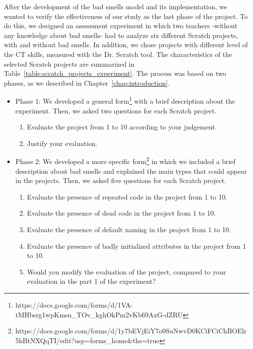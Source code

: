After the development of the bad smells model and its implementation, we wanted to verify the effectiveness of our study as the last phase of the project. To do this, we designed an assessment experiment in which two teachers -without any knowledge about bad smells- had to analyze six different Scratch projects, with and without bad smells. In addition, we chose projects with different level of the CT skills, measured with the Dr. Scratch tool. The characteristics of the selected Scratch projects are summarized in Table~\ref{table:scratch_projects_experiment}. The process was based on two phases, as we described in Chapter~\ref{chap:introduction}.

\begin{itemize}
    \item Phase 1: We developed a general form\footnote{https://docs.google.com/forms/d/1VA-tMHbsrg1wpKmsn\_TOv\_kghOkPm2vKb69AxG-dZRU} with a brief description about the experiment. Then, we asked two questions for each Scratch project.
    \begin{enumerate}
        \item Evaluate the project from 1 to 10 according to your judgement.
        \item Justify your evaluation.
    \end{enumerate}
    \item Phase 2: We developed a more specific form\footnote{https://docs.google.com/forms/d/1y7bEVjEiY7o0SuNwvD0KCiFCiChBOElr5hBtNXQqT\-I/edit?usp=forms\_home\&ths=true} in which we included a brief description about bad smells and explained the main types that could appear in the projects. Then, we asked five questions for each Scratch project.
    \begin{enumerate}
        \item Evaluate the presence of repeated code in the project from 1 to 10.
        \item Evaluate the presence of dead code in the project from 1 to 10.
        \item Evaluate the presence of default naming in the project from 1 to 10.
        \item Evaluate the presence of badly initialized attributes in the project from 1 to 10.
        \item Would you modify the evaluation of the project, compared to your evaluation in the part 1 of the experiment?
    \end{enumerate}
\end{itemize}

